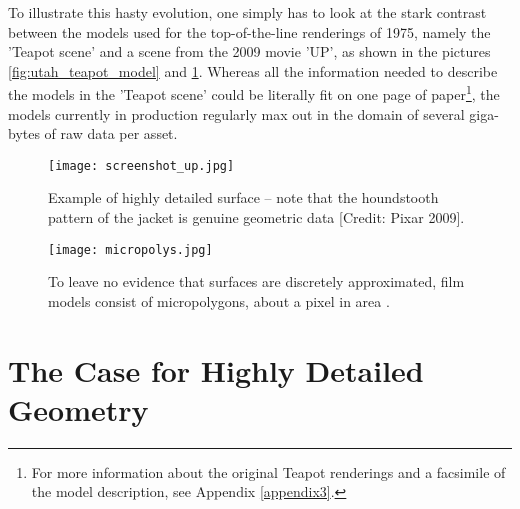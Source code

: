 To illustrate this hasty evolution, one simply has to look at the stark contrast between the models used for the top-of-the-line renderings of 1975, namely the 'Teapot scene' and a scene from the 2009 movie 'UP', as shown in the pictures \ref{fig:utah_teapot_model} and \ref{fig:micropolys}.
Whereas all the information needed to describe the models in the 'Teapot scene' could be literally fit on one page of paper\footnote{  For more information about the original Teapot renderings and a facsimile of the model description, see Appendix \ref{appendix3}.}, the models currently in production regularly max out in the domain of several giga-bytes of raw data per asset.
\begin{figure}[ht]
\begin{minipage}[b]{0.475\linewidth} \centering
\texttt{[image: screenshot\_up.jpg]}
\caption{Example of highly detailed surface -- note that the houndstooth pattern of the jacket is genuine geometric data {[}Credit: Pixar 2009{]}.}
\label{fig:screenshot_up}
\end{minipage}
\hspace{0.35cm}
\begin{minipage}[b]{0.475\linewidth}
\centering
\texttt{[image: micropolys.jpg]}
\caption{To leave no evidence that surfaces are discretely approximated, film models consist of micropolygons, about a pixel in area \citep[][p.7]{Fatahalian2011}.}
\label{fig:micropolys}
\end{minipage}
\end{figure}

\section{The Case for Highly Detailed Geometry}
\label{introduction2}

